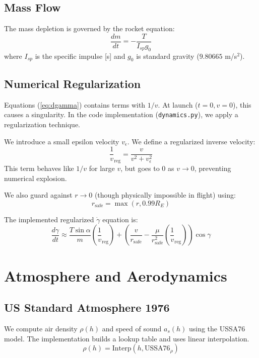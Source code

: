 \documentclass[11pt]{article}
\begin{document}
\subsection{Mass Flow}
The mass depletion is governed by the rocket equation:
\begin{equation}
    \label{eq:dm}
    \frac{dm}{dt} = - \frac{T}{I_{sp} g_0}
\end{equation}
where $I_{sp}$ is the specific impulse [s] and $g_0$ is standard gravity ($9.80665$ m/s$^2$).

\subsection{Numerical Regularization}
\label{sec:regularization}
Equations (\ref{eq:dgamma}) contains terms with $1/v$. At launch ($t=0, v=0$), this causes a singularity. In the code implementation (\texttt{dynamics.py}), we apply a regularization technique.

We introduce a small epsilon velocity $v_\epsilon$. We define a regularized inverse velocity:
\begin{equation}
    \label{eq:inv_v_reg}
    \frac{1}{v}_{\text{reg}} = \frac{v}{v^2 + v_\epsilon^2}
\end{equation}
This term behaves like $1/v$ for large $v$, but goes to $0$ as $v \to 0$, preventing numerical explosion.

We also guard against $r \to 0$ (though physically impossible in flight) using:
\begin{equation}
    \label{eq:r_safe}
    r_{\text{safe}} = \max(r, 0.99 R_E)
\end{equation}

The implemented regularized $\dot{\gamma}$ equation is:
\begin{equation}
    \label{eq:dgamma_reg}
    \frac{d\gamma}{dt} \approx \frac{T \sin\alpha}{m} \left(\frac{1}{v}_{\text{reg}}\right) + \left( \frac{v}{r_{\text{safe}}} - \frac{\mu}{r_{\text{safe}}^2} \left(\frac{1}{v}_{\text{reg}}\right) \right) \cos\gamma
\end{equation}

\section{Atmosphere and Aerodynamics}
\label{sec:atmosphere}

\subsection{US Standard Atmosphere 1976}
We compute air density $\rho(h)$ and speed of sound $a_s(h)$ using the USSA76 model. The implementation builds a lookup table and uses linear interpolation.
\begin{equation}
    \label{eq:rho_interp}
    \rho(h) = \text{Interp}(h, \text{USSA76}_{\rho})
\end{equation}
\end{document}
